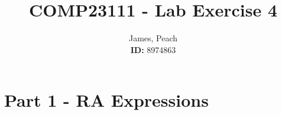 \documentclass[11pt,a4paper]{article}
\begin{document}
\title{\textbf{COMP23111} - Lab Exercise 4}

\author{James, Peach \\ \textbf{ID:} 8974863} 


\maketitle
\thispagestyle{empty} %
\newpage %

\section{Part 1 - RA Expressions}
\end{document}
